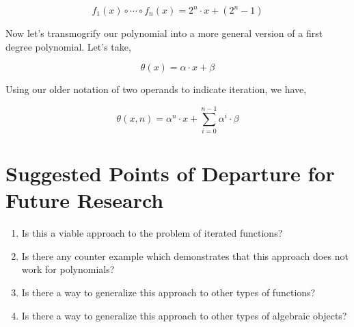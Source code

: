 \begin{equation}
    f_1(x) \circ \cdots \circ f_n(x) =  2^n \cdot x + (2^n - 1)
\end{equation}

Now let's transmogrify our polynomial into a more general version of a first
degree polynomial. Let's take,

\begin{equation}
    \theta(x) = \alpha \cdot x + \beta
\end{equation}

Using our older notation of two operands to indicate iteration, we have,

\begin{equation}
    \theta(x,n) = \alpha^n \cdot x + \sum_{i=0}^{n-1} \alpha^i \cdot \beta
\end{equation}

\section{Suggested Points of Departure for Future Research}
\begin{enumerate}
    \item Is this a viable approach to the problem of iterated functions?
    \item Is there any counter example which demonstrates that this approach does not
          work for polynomials?
    \item Is there a way to generalize this approach to other types of functions?
    \item Is there a way to generalize this approach to other types of algebraic objects?
\end{enumerate}